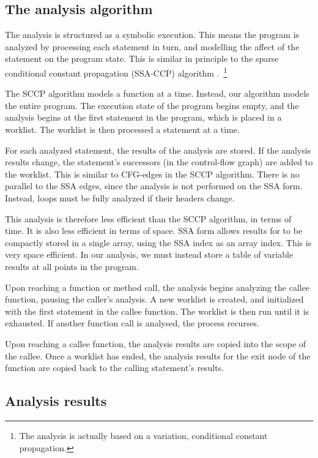 \subsection{The analysis algorithm}
The analysis is structured as a symbolic execution.  This means the
program is analyzed by processing each statement in turn, and
modelling the affect of the statement on the program state.  This is
similar in principle to the sparse conditional constant propagation
(SSA-CCP) algorithm .~\footnote{The analysis is actually
  based on a variation, conditional constant propagation.}


The SCCP algorithm models a function at a time.  Instead, our
algorithm models the entire program.  The execution state of the
program begins empty, and the analysis begins at the first statement
in the program, which is placed in a worklist.  The worklist is then
processed a statement at a time.

For each analyzed statement, the results of the analysis are stored.
If the analysis results change, the statement's successors (in the
control-flow graph) are added to the worklist. This is similar to
CFG-edges in the SCCP algorithm.  There is no parallel to the SSA
edges, since the analysis is not performed on the SSA form.  Instead,
loops must be fully analyzed if their headers change.

This analysis is therefore less efficient than the SCCP algorithm, in
terms of time.  It is also less efficient in terms of space.
SSA form allows results for to be compactly stored in a single array,
using the SSA index as an array index.  This is very space efficient.
In our analysis, we must instead store a table of variable results at
all points in the program.

Upon reaching a function or method call, the analysis begins analyzing
the callee function, pausing the caller's analysis.  A new worklist is
created, and initialized with the first statement in the callee
function.  The worklist is then run until it is exhausted.  If another
function call is analysed, the process recurses.

Upon reaching a callee function, the analysis results are copied into
the scope of the callee.  Once a worklist has ended, the analysis
results for the exit node of the function are copied back to the
calling statement's results.

\subsection{Analysis results}

